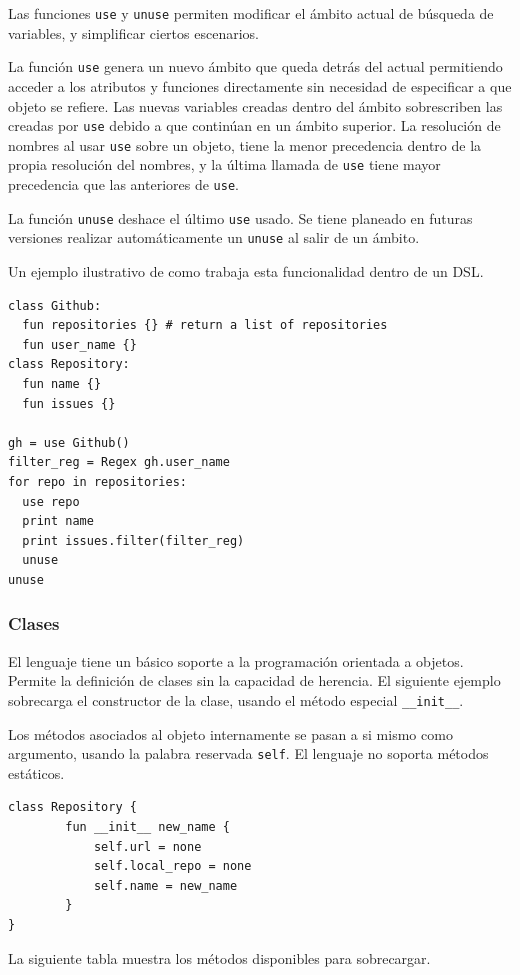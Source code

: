 \documentclass[11pt]{article}
\begin{document}
Las funciones \texttt{use} y \texttt{unuse} permiten modificar el ámbito actual de búsqueda de variables, y simplificar ciertos escenarios.

La función \texttt{use} genera un nuevo ámbito que queda detrás del actual permitiendo acceder a los atributos y funciones directamente
sin necesidad de especificar a que objeto se refiere. Las nuevas
variables creadas dentro del ámbito sobrescriben las creadas por \texttt{use}
debido a que continúan en un ámbito superior. La resolución de nombres al usar \texttt{use} sobre un objeto, tiene la menor precedencia
dentro de la propia resolución del nombres, y la última llamada de \texttt{use} tiene mayor precedencia que las anteriores de \texttt{use}.

La función \texttt{unuse} deshace el último \texttt{use} usado. Se tiene planeado en futuras versiones realizar automáticamente un \texttt{unuse} al salir de un ámbito.

Un ejemplo ilustrativo de como trabaja esta funcionalidad dentro de un DSL.

\begin{verbatim}
class Github:
  fun repositories {} # return a list of repositories
  fun user_name {}
class Repository:
  fun name {}
  fun issues {}

gh = use Github()
filter_reg = Regex gh.user_name
for repo in repositories:
  use repo
  print name
  print issues.filter(filter_reg)
  unuse
unuse
\end{verbatim}

\subsubsection{Clases}
\label{sec:org1b5e0cb}
El lenguaje tiene un básico soporte a la programación orientada a objetos. Permite la definición
de clases sin la capacidad de herencia. El siguiente ejemplo sobrecarga el constructor de la clase,
usando el método especial \texttt{\_\_init\_\_}.

Los métodos asociados al objeto internamente se pasan a si mismo como argumento, usando la palabra
reservada \texttt{self}. El lenguaje no soporta métodos estáticos.


\begin{verbatim}
class Repository {
        fun __init__ new_name {
            self.url = none
            self.local_repo = none
            self.name = new_name
        }
}
\end{verbatim}

La siguiente tabla muestra los métodos disponibles para sobrecargar.
\end{document}
